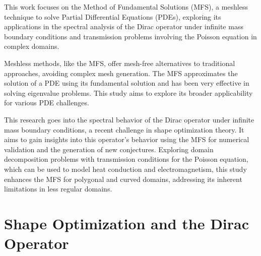\documentclass[5p,authoryear]{elsarticle}
\begin{document}
This work focuses on the Method of Fundamental Solutions (MFS), a meshless technique to solve Partial Differential Equations (PDEs), exploring its applications in the spectral analysis of the Dirac operator under infinite mass boundary conditions and transmission problems involving the Poisson equation in complex domains.

Meshless methods, like the MFS, offer mesh-free alternatives to traditional approaches, avoiding complex mesh generation. The MFS approximates the solution of a PDE using its fundamental solution and has been very effective in solving eigenvalue problems. This study aims to explore its broader applicability for various PDE challenges.

This research goes into the spectral behavior of the Dirac operator under infinite mass boundary conditions, a recent challenge in shape optimization theory. It aims to gain insights into this operator's behavior using the MFS for numerical validation and the generation of new conjectures. Exploring domain decomposition problems with transmission conditions for the Poisson equation, which can be used to model heat conduction and electromagnetism, this study enhances the MFS for polygonal and curved domains, addressing its inherent limitations in less regular domains.

\section{Shape Optimization and the Dirac Operator}



\end{document}
